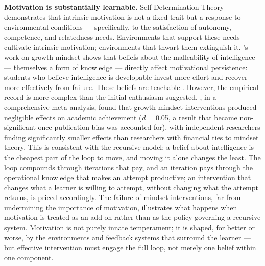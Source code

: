 \documentclass[12pt,a4paper]{article}
\begin{document}
\textbf{Motivation is substantially learnable.} Self-Determination Theory \citep{DeciRyan2000} demonstrates that intrinsic motivation is not a fixed trait but a response to environmental conditions ---\hspace{0pt} specifically, to the satisfaction of autonomy, competence, and relatedness needs. Environments that support these needs cultivate intrinsic motivation; environments that thwart them extinguish it. \citeauthor{Dweck2006}'s \citeyearpar{Dweck2006} work on growth mindset shows that beliefs about the malleability of intelligence ---\hspace{0pt} themselves a form of knowledge ---\hspace{0pt} directly affect motivational persistence: students who believe intelligence is developable invest more effort and recover more effectively from failure. These beliefs are teachable \citep{YeagerDweck2012}. However, the empirical record is more complex than the initial enthusiasm suggested. \citet{MacnamaraBurgoyne2023}, in a comprehensive meta-analysis, found that growth mindset interventions produced negligible effects on academic achievement (\emph{d} = 0.05, a result that became non-significant once publication bias was accounted for), with independent researchers finding significantly smaller effects than researchers with financial ties to mindset theory. This is consistent with the recursive model: a belief about intelligence is the cheapest part of the loop to move, and moving it alone changes the least. The loop compounds through iterations that pay, and an iteration pays through the operational knowledge that makes an attempt productive; an intervention that changes what a learner is willing to attempt, without changing what the attempt returns, is priced accordingly. The failure of mindset interventions, far from undermining the importance of motivation, illustrates what happens when motivation is treated as an add-on rather than as the policy governing a recursive system. Motivation is not purely innate temperament; it is shaped, for better or worse, by the environments and feedback systems that surround the learner ---\hspace{0pt} but effective intervention must engage the full loop, not merely one belief within one component.
\end{document}
